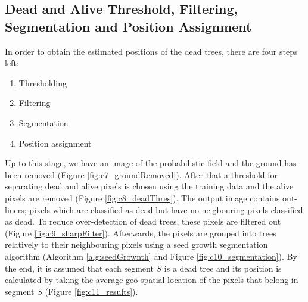\documentclass{subfiles}
\begin{document}
 


 \subsection{Dead and Alive Threshold, Filtering, Segmentation and Position Assignment }\label{sec:Segmentation}

  \par In order to obtain the estimated positions of the dead trees, there are four steps left:
  \begin{enumerate}
  	\item Thresholding 
  	\item Filtering
  	\item Segmentation
  	\item Position assignment 
  \end{enumerate}
  
  \par Up to this stage, we have an image of the probabilistic field and the ground has been removed (Figure \ref{fig:c7_groundRemoved}). After that a threshold for separating dead and alive pixels is chosen using the training data and the alive pixels are removed (Figure \ref{fig:c8_deadThres}). The output image contains out-liners; pixels which are classified as dead but have no neigbouring pixels classified as dead. To reduce over-detection of dead trees, these pixels are filtered out (Figure \ref{fig:c9_sharpFilter}). Afterwards, the pixels are grouped into trees relatively to their neighbouring pixels using a seed growth segmentation algorithm (Algorithm \ref{alg:seedGrownth} and Figure \ref{fig:c10_segmentation}). By the end, it is assumed that each segment $S$ is a dead tree and its position is calculated by taking the average geo-spatial location of the pixels that belong in segment $S$ (Figure \ref{fig:c11_results}). 
 
 
\end{document}
